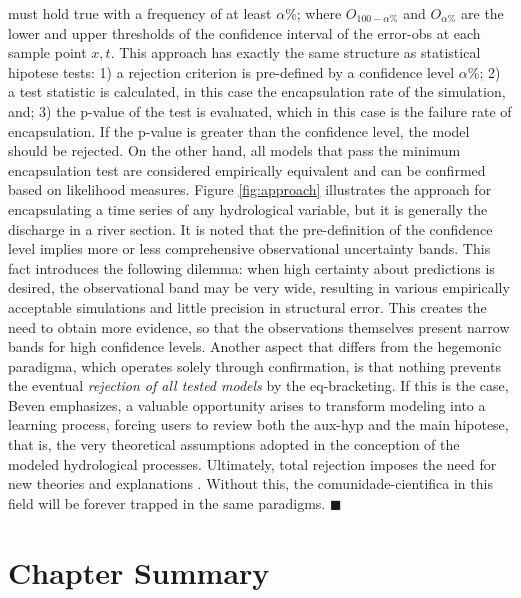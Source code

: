 \documentclass[./main_en.tex]{subfiles}
\begin{document}
must hold true with a frequency of at least $\alpha\%$; where $O_{100-\alpha\%}$ and $O_{\alpha\%}$ are the lower and upper thresholds of the confidence interval of the \gls{error-obs} at each sample point $x, t$. This approach has exactly the same structure as statistical \gls{hipotese} tests: 1) a rejection criterion is pre-defined by a confidence level $\alpha$\%; 2) a test statistic is calculated, in this case the encapsulation rate of the simulation, and; 3) the p-value of the test is evaluated, which in this case is the failure rate of encapsulation. If the p-value is greater than the confidence level, the \gls{model} should be rejected. On the other hand, all models that pass the minimum encapsulation test are considered empirically equivalent and can be confirmed based on \gls{likelihood} measures. Figure \ref{fig:approach} illustrates the approach for encapsulating a time series of any hydrological variable, but it is generally the discharge in a river section. It is noted that the pre-definition of the confidence level implies more or less comprehensive observational uncertainty bands. This fact introduces the following dilemma: when high certainty about predictions is desired, the observational band may be very wide, resulting in various empirically acceptable simulations and little precision in structural error. This creates the need to obtain more evidence, so that the observations themselves present narrow bands for high confidence levels. Another aspect that differs from the hegemonic \gls{paradigma}, which operates solely through confirmation, is that nothing prevents the eventual \textit{rejection of all tested models} by the \gls{eq-bracketing}. If this is the case, Beven emphasizes, a valuable opportunity arises to transform modeling into a learning process, forcing users to review both the \gls{aux-hyp} and the main \gls{hipotese}, that is, the very theoretical assumptions adopted in the conception of the modeled hydrological processes. Ultimately, total rejection imposes the need for new theories and explanations \cite{Beven2018}. Without this, the \gls{comunidade-cientifica} in this field will be forever trapped in the same paradigms. $\blacksquare$

\clearpage

\section{Chapter Summary} \label{sec:epis:summary}
\end{document}
